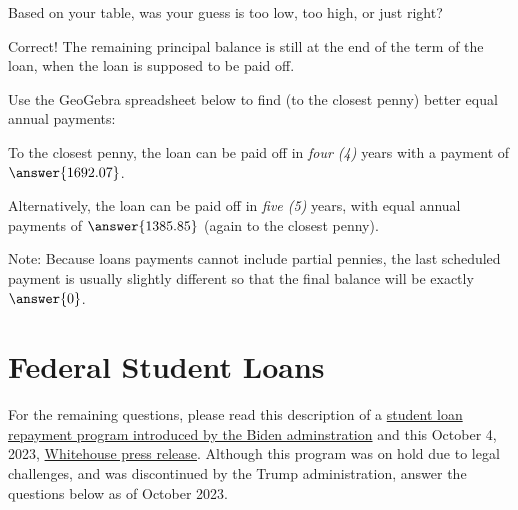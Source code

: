 \documentclass[handout,space,nooutcomes]{ximera}
\begin{document}
\begin{question}
Based on your table, was your guess is too low, too high, or just
right?  
\begin{multipleChoice}
\end{multipleChoice}
\vfill
\begin{question}
Correct!  The remaining principal balance is still  at the end of the term of the loan, when the loan is supposed to be paid off.  

Use the GeoGebra spreadsheet below to find (to the closest penny) better equal annual payments: 
\begin{center}
\end{center}
To the closest penny, the loan can be paid off in \emph{four (4)} years with a payment of $\answer{1692.07}$.  

Alternatively, the loan can be paid off in \emph{five (5)} years, with equal annual payments of $\answer{1385.85}$ (again to the closest penny).  

Note: Because loans payments cannot include partial pennies, the last scheduled payment is usually slightly different so that the final balance will be exactly $\answer{0}$.  
\end{question}
\end{question}

\section*{Federal Student Loans}
For the remaining questions, please read this description of a \href{https://bidenwhitehouse.archives.gov/briefing-room/statements-releases/2023/08/22/fact-sheet-the-biden-harris-administration-launches-the-save-plan-the-most-affordable-student-loan-repayment-plan-ever-to-lower-monthly-payments-for-millions-of-borrowers/}{student loan repayment program introduced by the Biden adminstration} 
and this October 4, 2023, 
\href{https://bidenwhitehouse.archives.gov/briefing-room/statements-releases/2023/10/04/president-biden-announces-an-additional-9-billion-in-student-debt-relief-for-125000-americans/}{Whitehouse press release}.  Although this program was on hold due to legal challenges, and was discontinued by the Trump administration, 
answer the questions below as of October 2023.  
\end{document}

